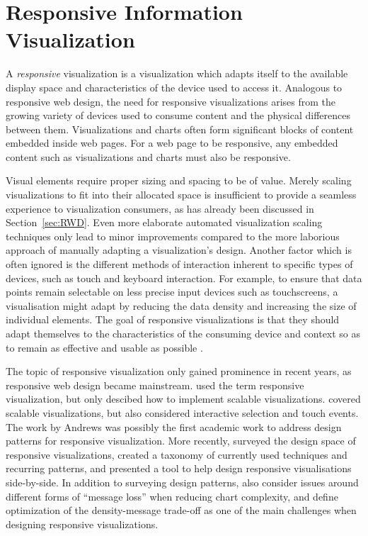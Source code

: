 
\chapter{Responsive Information Visualization}
\label{chap:ResponsiveInformationVisualization}

A \emph{responsive} visualization is a visualization which adapts
itself to the available display space and characteristics of the
device used to access it. Analogous to responsive web design, the need
for responsive visualizations arises from the growing variety of
devices used to consume content and the physical differences between
them.  Visualizations and charts often form significant blocks of
content embedded inside web pages. For a web page to be responsive,
any embedded content such as visualizations and charts must also be
responsive.

Visual elements require proper sizing and spacing to be of value.
Merely scaling visualizations to fit into their allocated space is
insufficient to provide a seamless experience to visualization
consumers, as has already been discussed in Section~\ref{sec:RWD}.
Even more elaborate automated visualization scaling techniques
\parencite{ViSizer, MobileVisFixer, SemanticResizing} only lead to
minor improvements compared to the more laborious approach of manually
adapting a visualization's design. Another factor which is often
ignored is the different methods of interaction inherent to specific
types of devices, such as touch and keyboard interaction. For example,
to ensure that data points remain selectable on less precise input
devices such as touchscreens, a visualisation might adapt by reducing
the data density and increasing the size of individual elements. The
goal of responsive visualizations is that they should adapt themselves
to the characteristics of the consuming device and context so as to
remain as effective and usable as possible
\parencite{DesignPatternsTradeOffsRespVis}.


The topic of responsive visualization only gained prominence in recent
years, as responsive web design became mainstream.
\textcite{BuildingRespDataVisForTheWeb} used the term responsive
visualization, but only descibed how to implement scalable
visualizations. \textcite{LearningRespDataVis} covered scalable
visualizations, but also considered interactive selection and touch
events. The work by Andrews
\parencite{RespVisTalk,RespVisPage,RespVis} was possibly the first
academic work to address design patterns for responsive visualization.
%
More recently, \parencite{TechniquesForFlexibleRespVisDesign} surveyed
the design space of responsive visualizations, created a taxonomy of
currently used techniques and recurring patterns, and presented a tool
to help design responsive visualisations side-by-side. In addition to
surveying design patterns, \textcite{DesignPatternsTradeOffsRespVis}
also consider issues around different forms of \enquote{message loss}
when reducing chart complexity, and define optimization of the
density-message trade-off as one of the main challenges when designing
responsive visualizations.


